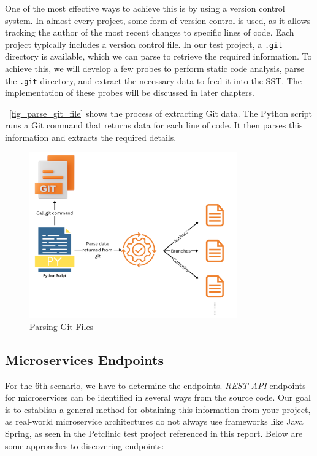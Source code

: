 One of the most effective ways to achieve this is by using a version control system. In almost every project, some form of version control is used, as it allows tracking the author of the most recent changes to specific lines of code. Each project typically includes a version control file. In our test project, a \texttt{.git} directory is available, which we can parse to retrieve the required information. To achieve this, we will develop a few probes to perform static code analysis, parse the \texttt{.git} directory, and extract the necessary data to feed it into the SST. The implementation of these probes will be discussed in later chapters.

~\autoref{fig_parse_git_file} shows the process of extracting Git data. The Python script runs a Git command that returns data for each line of code. It then parses this information and extracts the required details.

\begin{figure}[H]
    \centering
    \includegraphics[width=0.8\textwidth]{figures/parse_git_file_2.png}
    \caption{Parsing Git Files}
    \label{fig_parse_git_file}
\end{figure}
 
\subsection{Microservices Endpoints}

For the 6th scenario, we have to determine the endpoints. \textit{REST API} endpoints for microservices can be identified in several ways from the source code. Our goal is to establish a general method for obtaining this information from your project, as real-world microservice architectures do not always use frameworks like Java Spring, as seen in the Petclinic test project referenced in this report. Below are some approaches to discovering endpoints:

